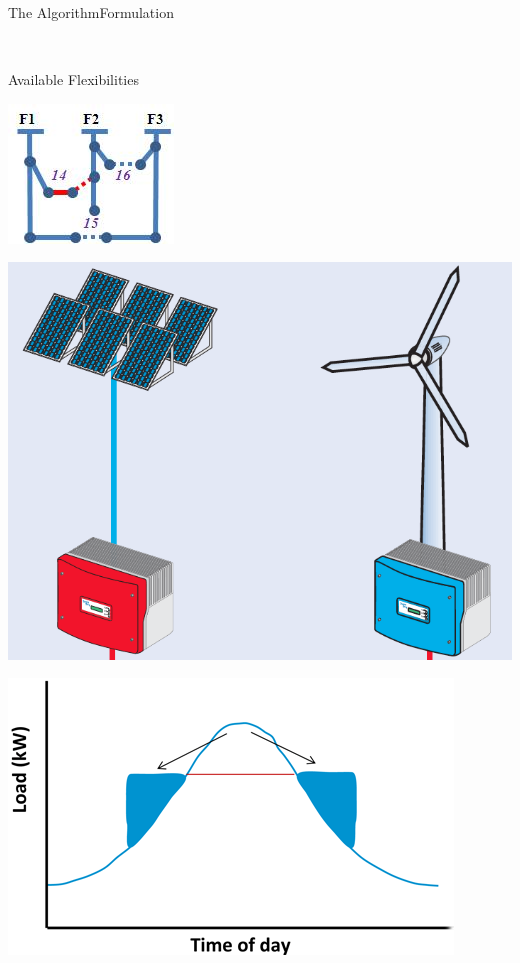 \documentclass[xcolor=svgnames,aspectratio=32,8pt]{beamer}
\begin{document}
\begin{frame}
  {The Algorithm}{Formulation}
\begin{changemargin}{-1cm}{-1cm}
\centering
\vspace{0.4cm}
\resizebox{0.9\paperwidth}{!}{%
  
}\\ \pause
\vspace{0.5cm}

Available Flexibilities\\
\vspace{0.15cm}
\begin{minipage}[!h]{0.25\paperwidth}
  \centering
  \includegraphics[width=0.2\paperwidth]{OtherImages/reconf.jpg}
\end{minipage}%
\begin{minipage}[!h]{0.25\paperwidth}
  \centering
  \includegraphics[width=0.2\paperwidth]{OtherImages/VVC.png}
\end{minipage}%
\begin{minipage}[!h]{0.25\paperwidth}
  \centering
  \includegraphics[width=0.2\paperwidth]{OtherImages/LR.png}

\end{minipage}
\end{changemargin}
\end{frame}
\end{document}
